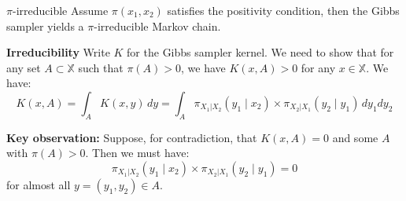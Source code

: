 
\begin{frame}{$\pi$-irreducible}
Assume $\pi(x_1, x_2)$ satisfies the positivity condition, then the Gibbs sampler
yields a $\pi$-irreducible Markov chain.

\textbf{Irreducibility} Write $K$ for the Gibbs sampler kernel. We need to show that for 
any set $A \subset \mathbb{X}$ such that $\pi(A) > 0$, we have $K(x, A) > 0$ for 
any $x \in \mathbb{X}$. We have:
\begin{equation}
K(x, A) = \int_A K(x, y)\,dy = \int_A \pi_{X_1|X_2}(y_1 \mid x_2) \times \pi_{X_2|X_1}(y_2 \mid y_1)\,dy_1dy_2
\end{equation}



\textbf{Key observation:} Suppose, for contradiction, that $K(x, A) = 0$ and some $A$ with $\pi(A) > 0$.
Then we must have:
\begin{equation}
\pi_{X_1|X_2}(y_1 \mid x_2) \times \pi_{X_2|X_1}(y_2 \mid y_1) = 0
\end{equation}
for almost all $y = (y_1, y_2) \in A$.

\end{frame}

